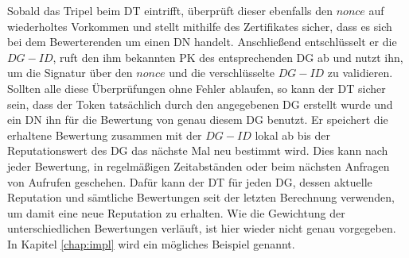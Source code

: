 \documentclass[
	fontsize=11pt,
	headings=small,
	parskip=half,           %
	bibliography=totoc,
	numbers=noenddot,       %
	open=any,               %
]{scrreprt}
\begin{document}
Sobald das Tripel beim DT eintrifft, überprüft dieser ebenfalls den $nonce$ auf wiederholtes Vorkommen und stellt mithilfe des Zertifikates sicher, dass es sich bei dem Bewerterenden um einen DN handelt. Anschließend entschlüsselt er die $DG-ID$, ruft den ihm bekannten PK des entsprechenden DG ab und nutzt ihn, um die Signatur über den $nonce$ und die verschlüsselte $DG-ID$ zu validieren. Sollten alle diese Überprüfungen ohne Fehler ablaufen, so kann der DT sicher sein, dass der Token tatsächlich durch den angegebenen DG erstellt wurde und ein DN ihn für die Bewertung von genau diesem DG benutzt. Er speichert die erhaltene Bewertung zusammen mit der $DG-ID$ lokal ab bis der Reputationswert des DG das nächste Mal neu bestimmt wird. Dies kann nach jeder Bewertung, in regelmäßigen Zeitabständen oder beim nächsten Anfragen von Aufrufen geschehen. Dafür kann der DT für jeden DG, dessen aktuelle Reputation und sämtliche Bewertungen seit der letzten Berechnung verwenden, um damit eine neue Reputation zu erhalten. Wie die Gewichtung der unterschiedlichen Bewertungen verläuft, ist hier wieder nicht genau vorgegeben. In Kapitel \ref{chap:impl} wird ein mögliches Beispiel genannt.
\end{document}

